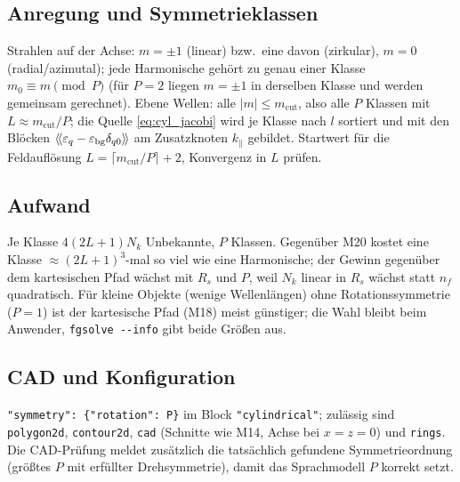 \subsection{Anregung und Symmetrieklassen}
Strahlen auf der Achse: $m=\pm1$ (linear) bzw.\ eine davon (zirkular), $m=0$ (radial/azimutal); jede Harmonische
gehört zu genau einer Klasse $m_0\equiv m\pmod P$ (für $P=2$ liegen $m=\pm1$ in derselben Klasse und werden gemeinsam
gerechnet). Ebene Wellen: alle $|m|\le m_{\text{cut}}$, also alle $P$ Klassen mit $L\approx m_{\text{cut}}/P$; die Quelle
\eqref{eq:cyl_jacobi} wird je Klasse nach $l$ sortiert und mit den Blöcken $\langle\!\langle \varepsilon_q-\varepsilon_{\text{bg}}\delta_{q0}\rangle\!\rangle$ am
Zusatzknoten $k_\parallel$ gebildet. Startwert für die Feldauflösung $L=\lceil m_{\text{cut}}/P\rceil+2$, Konvergenz in $L$ prüfen.

\subsection{Aufwand}
Je Klasse $4(2L+1)N_k$ Unbekannte, $P$ Klassen. Gegenüber M20 kostet eine Klasse $\approx(2L+1)^3$-mal so viel wie eine
Harmonische; der Gewinn gegenüber dem kartesischen Pfad wächst mit $R_s$ und $P$, weil $N_k$ linear in $R_s$ wächst
statt $n_f$ quadratisch. Für kleine Objekte (wenige Wellenlängen) ohne Rotationssymmetrie ($P=1$) ist der kartesische
Pfad (M18) meist günstiger; die Wahl bleibt beim Anwender, \verb|fgsolve --info| gibt beide Größen aus.

\subsection{CAD und Konfiguration}
\verb|"symmetry": {"rotation": P}| im Block \verb|"cylindrical"|; zulässig sind \verb|polygon2d|, \verb|contour2d|,
\verb|cad| (Schnitte wie M14, Achse bei $x=z=0$) und \verb|rings|. Die CAD-Prüfung meldet zusätzlich die tatsächlich
gefundene Symmetrieordnung (größtes $P$ mit erfüllter Drehsymmetrie), damit das Sprachmodell $P$ korrekt setzt.

